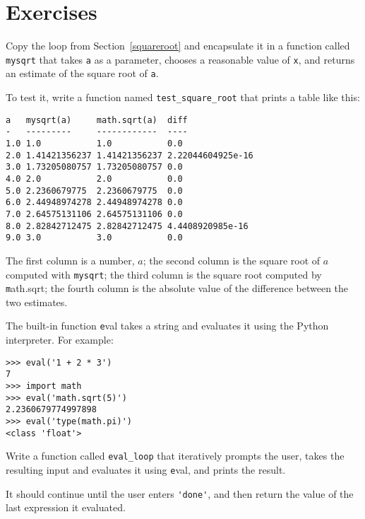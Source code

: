 \documentclass[
DIV=11,
fontsize=13,
twoside,
headinclude=false,
titlepage=firstiscover,
abstract=true,
headsepline=true,
footsepline=true,
chapterprefix=true, %
headings=big,
bibliography=totoc,%
captions=tableheading
]{scrbook}
\theoremstyle{definition}
\begin{document}
\section{Exercises}

\begin{exercise}
\normalfont
{}

Copy the loop from Section~\ref{squareroot}
and encapsulate it in a function called
\verb"mysqrt" that takes {\texttt a} as a parameter, chooses a
reasonable value of {\texttt x}, and returns an estimate of the square
root of {\texttt a}.  

To test it, write a function named \verb"test_square_root"
that prints a table like this:

\begin{lstlisting}
a   mysqrt(a)     math.sqrt(a)  diff
-   ---------     ------------  ----
1.0 1.0           1.0           0.0
2.0 1.41421356237 1.41421356237 2.22044604925e-16
3.0 1.73205080757 1.73205080757 0.0
4.0 2.0           2.0           0.0
5.0 2.2360679775  2.2360679775  0.0
6.0 2.44948974278 2.44948974278 0.0
7.0 2.64575131106 2.64575131106 0.0
8.0 2.82842712475 2.82842712475 4.4408920985e-16
9.0 3.0           3.0           0.0
\end{lstlisting}
%
The first column is a number, $a$; the second column is the square
root of $a$ computed with \verb"mysqrt"; the third column is the
square root computed by {\texttt math.sqrt}; the fourth column is the
absolute value of the difference between the two estimates.
\end{exercise}


\begin{exercise}
\normalfont
{}

The built-in function {\texttt eval} takes a string and evaluates
it using the Python interpreter.  For example:

\begin{lstlisting}
>>> eval('1 + 2 * 3')
7
>>> import math
>>> eval('math.sqrt(5)')
2.2360679774997898
>>> eval('type(math.pi)')
<class 'float'>
\end{lstlisting}
%
Write a function called \verb"eval_loop" that iteratively
prompts the user, takes the resulting input and evaluates
it using {\texttt eval}, and prints the result.

It should continue until the user enters \verb"'done'", and then
return the value of the last expression it evaluated.

\end{exercise}
\end{document}

